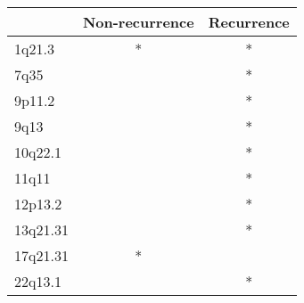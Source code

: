 \begin{tabular}{lcc}
\toprule
{} & Non-recurrence & Recurrence \\
\midrule
1q21.3   &              * &          * \\
7q35     &                &          * \\
9p11.2   &                &          * \\
9q13     &                &          * \\
10q22.1  &                &          * \\
11q11    &                &          * \\
12p13.2  &                &          * \\
13q21.31 &                &          * \\
17q21.31 &              * &            \\
22q13.1  &                &          * \\
\bottomrule
\end{tabular}
